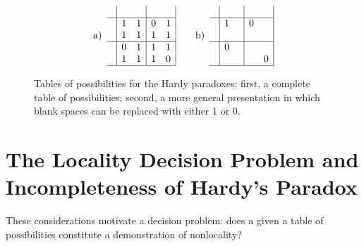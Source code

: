 \documentclass[reprint]{revtex4-1}
\theoremstyle{definition}
\begin{document}
\begin{figure}
\begin{equation*}\mbox{a)} \enspace
\begin{array}{c| c c | c c |}
&&&&\\ \hline
&1 &1  &0 & 1\\
&1&1  &1&1\\ \hline
&0&1&1&1 \\
&1&1 &1 &0 \\ \hline
\end{array}\quad\quad \mbox{b)} \enspace
\begin{array}{c| c c | c c |}
&&&&\\ \hline
&1 & & 0 & \\
&& & & \\ \hline
&0& & &  \\
&& & & 0 \\ \hline
\end{array}
\end{equation*}
\caption{Tables of possibilities for the Hardy paradoxes: first, a complete table of possibilities; second, a more general presentation in which blank spaces can be replaced with either 1 or 0.}
\label{HardyParadox}
\end{figure}
\section{The Locality Decision Problem and Incompleteness of Hardy's Paradox}\label{dpandincompleteness}

These considerations motivate a decision problem: does a given a table of possibilities constitute a demonstration of nonlocality?
\end{document}
